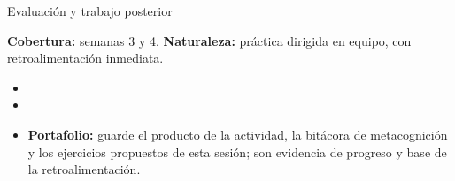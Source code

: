 \documentclass[10pt,aspectratio=169]{beamer}
\begin{document}
\begin{frame}{Evaluación y trabajo posterior}
  \small
  \begin{evalbox}
    \textbf{Cobertura:} semanas 3 y 4. \textbf{Naturaleza:} práctica dirigida en equipo, con retroalimentación inmediata.
  \end{evalbox}
  \begin{itemize}
    \item \criterios
    \item \declaracionia
    \item \textbf{Portafolio:} guarde el producto de la actividad, la bitácora de metacognición y los ejercicios propuestos de esta sesión; son evidencia de progreso y base de la retroalimentación.
  \end{itemize}
\end{frame}
\end{document}
